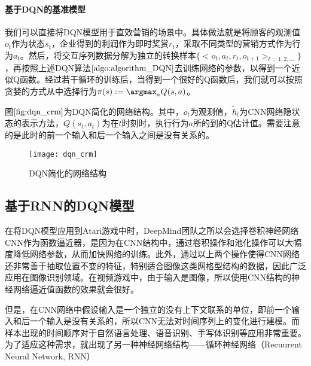 \paragraph{基于DQN的基准模型}
我们可以直接将DQN模型用于直效营销的场景中。具体做法就是将顾客的观测值$o_{t}$作为状态$s_{t}$，企业得到的利润作为即时奖赏$r_{t}$，采取不同类型的营销方式作为行为$a_{t}$。然后，将交互序列数据分解为独立的转换样本$\{<o_{t}, a_{t}, r_{t}, o_{t+1}>_{t=1,2,...}\}$，再按照上述DQN算法$\ref{algo:algorithm_DQN}$去训练网络的参数，以得到一个近似Q函数。经过若干循环的训练后，当得到一个很好的Q函数后，我们就可以按照贪婪的方式从中选择行为$\pi(s):=\argmax_{a}Q(s,a)$。

图$\ref{fig:dqn_crm}$为DQN简化的网络结构。其中，$o_{t}$为观测值，$\tilde{h}_{t}$为CNN网络隐状态的表示方法，$Q(s_{t},a_{t})$为在$t$时刻时，执行行为$a$所的到的Q估计值。需要注意的是此时的前一个输入和后一个输入之间是没有关系的。
\begin{figure}[htbp]
\centering
\texttt{[image: dqn\_crm]}
\caption{DQN简化的网络结构}
\label{fig:dqn_crm}
\end{figure}

\subsection{基于RNN的DQN模型}
在将DQN模型应用到Atari游戏中时\citep{mnih2013playing}，DeepMind团队之所以会选择卷积神经网络CNN作为函数逼近器，是因为在CNN结构中，通过卷积操作和池化操作可以大幅度降低网络参数，从而加快网络的训练。此外，通过以上两个操作使得CNN网络还非常善于抽取位置不变的特征，特别适合图像这类网格型结构的数据，因此广泛应用在图像识别领域。在视频游戏中，由于输入是图像，所以使用CNN结构的神经网络逼近值函数的效果就会很好。

但是，在CNN网络中假设输入是一个独立的没有上下文联系的单位，即前一个输入和后一个输入是没有关系的，所以CNN无法对时间序列上的变化进行建模。而样本出现的时间顺序对于自然语言处理、语音识别、手写体识别等应用非常重要。为了适应这种需求，就出现了另一种神经网络结构——循环神经网络（Recuurent Neural Network, RNN）



